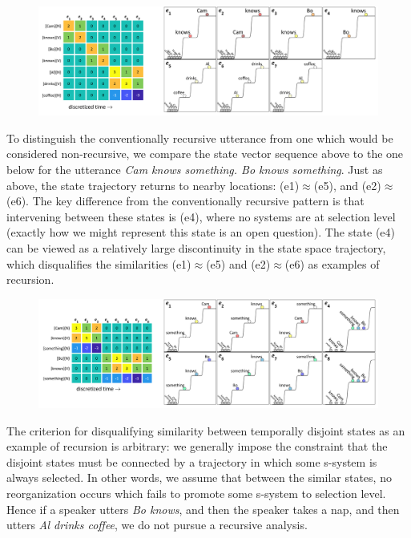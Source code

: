   
\begin{figure}
\includegraphics[width=\textwidth]{figures/Tilsen-img112.png}
\caption{\missingcaption}
\label{fig:5:8}
\end{figure}
 

  To distinguish the conventionally recursive utterance from one which would be considered non-recursive, we compare the state vector sequence above to the one below for the utterance \textit{Cam knows something. Bo knows something}. Just as above, the state trajectory returns to nearby locations: (e1)${\approx}$(e5), and (e2)${\approx}$(e6). The key difference from the conventionally recursive pattern is that intervening between these states is (e4), where no systems are at selection level (exactly how we might represent this state is an open question). The state (e4) can be viewed as a relatively large discontinuity in the state space trajectory, which disqualifies the similarities (e1)${\approx}$(e5) and (e2)${\approx}$(e6) as examples of recursion.

  
\begin{figure}
\includegraphics[width=\textwidth]{figures/Tilsen-img113.png}
\caption{\missingcaption}
\label{fig:5:9}
\end{figure}
 

  The criterion for disqualifying similarity between temporally disjoint states as an example of recursion is arbitrary: we generally impose the constraint that the disjoint states must be connected by a trajectory in which some s-system is always selected. In other words, we assume that between the similar states, no reorganization occurs which fails to promote some s-system to selection level. Hence if a speaker utters \textit{Bo knows}, and then the speaker takes a nap, and then utters \textit{Al drinks coffee}, we do not pursue a recursive analysis. 

